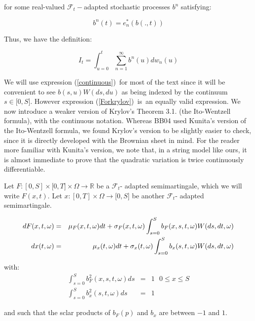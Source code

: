 \documentclass{article}
\begin{document}
for some real-valued $\mathcal{F}_{t}-$adapted stochastic processes $b^{n}$
satisfying:

\begin{equation*}
b^{n}(t)=e_{n}^{\ast }(b(.,t))
\end{equation*}

Thus, we have the definition:

\begin{equation}
I_{t}=\int_{u=0}^{t}\sum_{n=1}^{\infty }b^{n}(u)dw_{n}(u)  \label{Forkrylov}
\end{equation}

We will use expression (\ref{continuous})\ for most of the text since it
will be convenient to see $b(s,u)W(ds,du)$ as being indexed by the continuum
$s\in \lbrack 0,S]$. However expression (\ref{Forkrylov})\ is\ an equally
valid expression. We now introduce a weaker version of Krylov's \cite{Kry09}
Theorem 3.1. (the Ito-Wentzell formula), with the continuous notation.
Whereas BB04 used Kunita's \cite{Kun97} version of the Ito-Wentzell formula,
we found Krylov's version to be slightly easier to check, since it is
directly developed with the Brownian sheet in mind. For the reader more
familiar with Kunita's version, we note that, in a string model like ours,
it is almost immediate to prove that the quadratic variation is twice
continuously differentiable.

\bigskip

Let $F:[0,S]\times \lbrack 0,T]\times \Omega \rightarrow \mathbb{R}$ be a $%
\mathcal{F}_{t}$- adapted semimartingale, which we will write $F(x,t)$. Let $%
x:[0,T]\times \Omega \rightarrow \lbrack 0,S]$ be another $\mathcal{F}_{t}$-
adapted semimartingale.

\begin{eqnarray}
dF(x,t,\omega ) &=&\mu _{F}(x,t,\omega )dt+\sigma _{F}(x,t,\omega
)\int_{s=0}^{S}b_{F}(x,s,t,\omega )W(ds,dt,\omega )  \label{dQ} \\
dx(t,\omega ) &=&\mu _{x}(t,\omega )dt+\sigma _{x}(t,\omega
)\int_{s=0}^{S}b_{x}(s,t,\omega )W(ds,dt,\omega )  \notag
\end{eqnarray}

with:%
\begin{eqnarray*}
\int_{s=0}^{S}b_{F}^{2}(x,s,t,\omega )ds &=&1\text{ \ \ \ \ \ \ \ }0\leq
x\leq S \\
\int_{s=0}^{S}b_{x}^{2}(s,t,\omega )ds &=&1
\end{eqnarray*}

and such that the sclar products of $b_{F}(p)$ and $b_{x}$ are between $-1$
and $1$.
\end{document}
